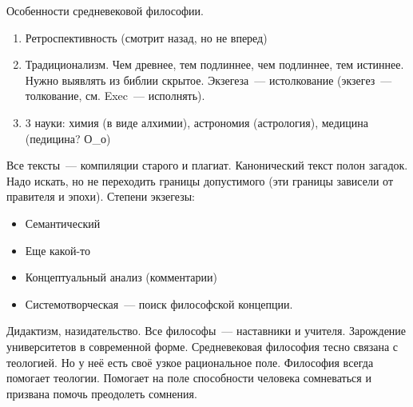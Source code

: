 Особенности средневековой философии.
\begin{enumerate}
	\item Ретроспективность (смотрит назад, но не вперед)
	\item Традиционализм. Чем древнее, тем подлиннее, чем подлиннее, тем истиннее. Нужно выявлять из библии скрытое. Экзегеза~--- истолкование (экзегез~--- толкование, см. Exec~--- исполнять).
	\item 3 науки: химия (в виде алхимии), астрономия (астрология), медицина (педицина? О\_о)
\end{enumerate}
Все тексты~--- компиляции старого и плагиат.
Канонический текст полон загадок. Надо искать, но не переходить границы допустимого (эти границы зависели от правителя и эпохи).
Степени экзегезы:

\begin{itemize}
	\item Семантический
	\item Еще какой-то
	\item Концептуальный анализ (комментарии)
	\item Системотворческая~--- поиск философской концепции.
\end{itemize}
Дидактизм, назидательство. Все философы~--- наставники и учителя. Зарождение университетов в современной форме.
Средневековая философия тесно связана с теологией. Но у неё есть своё узкое рациональное поле. Философия всегда помогает теологии. Помогает на поле способности человека сомневаться и призвана помочь преодолеть сомнения.
